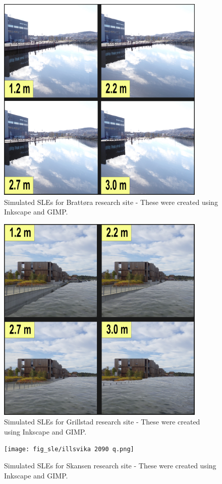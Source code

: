 \begin{figure}[H]
    \centering
    \includegraphics[width=10cm]{fig_sle/brattora 2090 q.png}
    \caption{Simulated SLEs for Brattøra research site - These were created using Inkscape and GIMP. }
    \label{fig:SLE-brattora}
\end{figure}

\begin{figure}[H]
    \centering
    \includegraphics[width=10cm]{fig_sle/grillstad 2090 q.png}
    \caption{Simulated SLEs for Grillstad research site - These were created using Inkscape and GIMP. }
    \label{fig:SLE-grillstad}
\end{figure}

\begin{figure}[H]
    \centering
    \texttt{[image: fig\_sle/illsvika 2090 q.png]}
    \caption{Simulated SLEs for Skansen research site - These were created using Inkscape and GIMP. }
    \label{fig:sle_skansen}
\end{figure}


